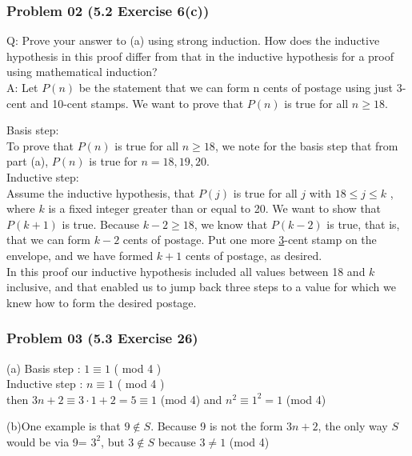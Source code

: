 \documentclass[14pt,hyperref={bookmarks=false}]{beamer}
\begin{document}
	\begin{frame}
	\frametitle{Problem 02 (5.2 Exercise 6(c))}
	\fontsize{9}{9pt}\selectfont
	Q: Prove your answer to (a) using strong induction. How does the inductive hypothesis in this proof differ from that in the inductive hypothesis for a proof using mathematical induction?\\
    \vspace*{0.1cm}
    A: Let $P(n)$ be the statement that we can form n cents of postage using just 3-cent and 10-cent stamps. We want to prove that $P(n)$ is true for all $n \geq 18$. 

Basis step:\\ To prove that $P(n)$ is true for all $n \geq 18$, we note for the basis step that from part (a), $P(n)$ is true for $n = 18, 19, 20$. \\

Inductive step:\\ Assume the inductive hypothesis, that $P(j)$ is true for all $j$ with $18 \leq j \leq k$ , where $k$ is a fixed integer greater than or equal to 20. We want to show that $P(k + 1)$ is true. Because $k - 2 \geq 18$, we know that $P(k - 2)$ is true, that is, that we can form $k - 2$ cents of postage. Put one more \underline{3}-cent stamp on the envelope, and we have formed $k + 1$ cents of postage, as desired.\\
    
In this proof our inductive hypothesis included all values between 18 and $k$ inclusive, and that enabled us to jump back three steps to a value for which we knew how to form the desired postage.
	\end{frame}	
	\begin{frame}
	\frametitle{Problem 03 (5.3 Exercise 26)}
	\fontsize{11}{12pt}\selectfont
	\setlength{\baselineskip}{5pt}

	(a)	Basis step : $1 \equiv 1$ ( mod 4 )\\
		Inductive step : $n \equiv 1 $ ( mod 4 )\\
		then $3n + 2 \equiv 3 · 1 + 2 = 5 \equiv 1$ (mod 4) and $n^2 \equiv 1^2 = 1$ (mod 4)\\ 

    \vspace*{0.5cm}
    
    (b)One example is that $9 \notin S $. Because 9 is not the  form $3n + 2$, the only way $S$ would be via 9= $3^2$, but $3 \notin S$ because $3 \neq 1$ (mod 4)\\

	\end{frame}
\end{document}
